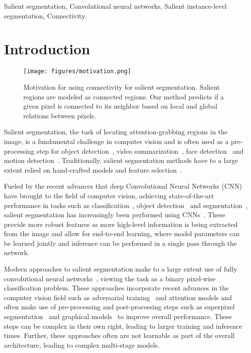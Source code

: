 \documentclass[journal]{IEEEtran}
\begin{document}
\begin{IEEEkeywords}
Salient segmentation, Convolutional neural networks, Salient instance-level segmentation, Connectivity.
\end{IEEEkeywords}

\IEEEpeerreviewmaketitle

\section{Introduction}

\begin{figure}[t]
\begin{center}
\texttt{[image: figures/motivation.png]}
\end{center}
   \caption{Motivation for using connectivity for salient segmentation. Salient regions are modeled as connected regions. Our method predicts if a given pixel is connected to its neighbor based on local and global relations between pixels.}
\label{fig:motivation}
\end{figure}

Salient segmentation, the task of locating attention-grabbing regions in the image, is a fundamental challenge in computer vision and is often used as a pre-processing step for object detection~\cite{navalpakkam2006integrated}, video summarization~\cite{ma2002user}, face detection~\cite{liu2017predicting} and motion detection~\cite{pathak2016learning}. Traditionally, salient segmentation methods have to a large extent relied on hand-crafted models and feature selection~\cite{valenti2009image,liu2011learning}.

Fueled by the recent advances that deep Convolutional Neural Networks (CNN) have brought to the field of computer vision, achieving state-of-the-art performance in tasks such as classification~\cite{krizhevsky2012imagenet,he2016deep}, object detection~\cite{girshick2015fast,ren2017faster} and segmentation~\cite{long2015fully,liang2018dynamic}, salient segmentation has increasingly been performed using CNNs~\cite{li2016deep,liu2016dhsnet,wang2016saliency}. These provide more robust features as more high-level information is being extracted from the image and allow for end-to-end learning, where model parameters can be learned jointly and inference can be performed in a single pass through the network. 

Modern approaches to salient segmentation make to a large extent use of fully convolutional neural networks~\cite{long2015fully}, viewing the task as a binary pixel-wise classification problem. These approaches incorporate recent advances in the computer vision field such as adversarial training~\cite{pan2017salgan,pan2017supervised} and attention models and often make use of pre-processing and post-processing steps such as superpixel segmentation~\cite{li2016deep,zhao2015saliency} and graphical models~\cite{li2016deep} to improve overall performance. These steps can be complex in their own right, leading to larger training and inference times. Further, these approaches often are not learnable as part of the overall architecture, leading to complex multi-stage models.
\end{document}
